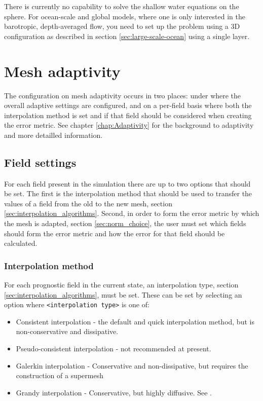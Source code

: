 There is currently no capability to solve the shallow water equations on the
sphere. For ocean-scale and global models, where one is only interested in the
barotropic, depth-averaged flow, you need to set up the problem using a 3D
configuration as described in section \ref{sec:large-scale-ocean} using a
single layer.

\section{Mesh adaptivity} \label{sec:config_adapt}

The configuration on mesh adaptivity occurs in two places: under  where 
the overall adaptive settings are configured, and on a per-field basis where both the interpolation
method is set and if that field should be considered when creating the error metric. See chapter 
\ref{chap:Adaptivity} for the background to adaptivity and more detailled information.

\subsection{Field settings}

For each field present in the simulation there are up to two options that should be set. The first
is the interpolation method that should be used to transfer the values of a field from the old to the new mesh, section \ref{sec:interpolation_algorithms}.
Second, in order to form the error metric by which the mesh is adapted, section \ref{sec:norm_choice}, the user must set which fields
should form the error metric and how the error for that field should be calculated.

\subsubsection{Interpolation method} \label{sec:config_adapt_interp}

For each prognostic field in the current state, an interpolation type, section \ref{sec:interpolation_algorithms}, must be set. These can be set by selecting an
option  where \texttt{<interpolation type>} is one of:
\begin{itemize}
\item Consistent interpolation - the default and quick interpolation method, but is non-conservative and dissipative.
\item Pseudo-consistent interpolation - not recommended at present.
\item Galerkin interpolation - Conservative and non-dissipative, but requires the construction of a supermesh \citep{farrell2009a,farrell2010a}
\item Grandy interpolation - Conservative, but highly diffusive. See \citet{grandy1999}.
\end{itemize}

